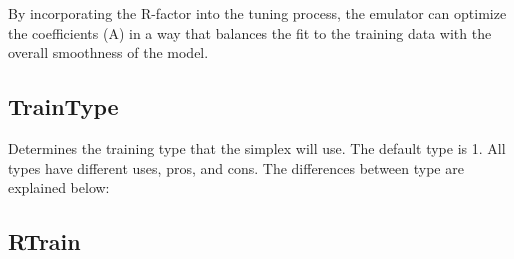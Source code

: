 \documentclass[12pt]{article}
\numberwithin{equation}{section}
\numberwithin{figure}{section}
\begin{document}
By incorporating the R-factor into the tuning process, the emulator can optimize the coefficients (A) in a way that balances the fit to the training data with the overall smoothness of the model.

\subsection{TrainType}
  Determines the training type that the simplex will use. The default type is 1. All types have different uses, pros, and cons. The differences between type are explained below:

  

\subsection{RTrain}
\end{document}
